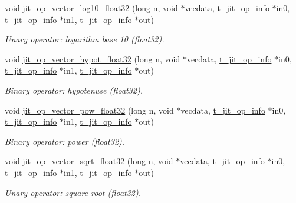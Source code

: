 \begin{DoxyCompactItemize}
void \hyperlink{group__opvecmod_ga8d105c8f794e923c3858dea7dc23eea1}{jit\_\-op\_\-vector\_\-log10\_\-float32} (long n, void $\ast$vecdata, \hyperlink{structt__jit__op__info}{t\_\-jit\_\-op\_\-info} $\ast$in0, \hyperlink{structt__jit__op__info}{t\_\-jit\_\-op\_\-info} $\ast$in1, \hyperlink{structt__jit__op__info}{t\_\-jit\_\-op\_\-info} $\ast$out)
\begin{DoxyCompactList}\small\item\em Unary operator: logarithm base 10 (float32). \item\end{DoxyCompactList}\item 
void \hyperlink{group__opvecmod_ga4cb86d8baf03ef12a90096aef213784d}{jit\_\-op\_\-vector\_\-hypot\_\-float32} (long n, void $\ast$vecdata, \hyperlink{structt__jit__op__info}{t\_\-jit\_\-op\_\-info} $\ast$in0, \hyperlink{structt__jit__op__info}{t\_\-jit\_\-op\_\-info} $\ast$in1, \hyperlink{structt__jit__op__info}{t\_\-jit\_\-op\_\-info} $\ast$out)
\begin{DoxyCompactList}\small\item\em Binary operator: hypotenuse (float32). \item\end{DoxyCompactList}\item 
void \hyperlink{group__opvecmod_ga8e5c012f8dcf346065ce6011a676a8dc}{jit\_\-op\_\-vector\_\-pow\_\-float32} (long n, void $\ast$vecdata, \hyperlink{structt__jit__op__info}{t\_\-jit\_\-op\_\-info} $\ast$in0, \hyperlink{structt__jit__op__info}{t\_\-jit\_\-op\_\-info} $\ast$in1, \hyperlink{structt__jit__op__info}{t\_\-jit\_\-op\_\-info} $\ast$out)
\begin{DoxyCompactList}\small\item\em Binary operator: power (float32). \item\end{DoxyCompactList}\item 
void \hyperlink{group__opvecmod_gaafc329ba4b3589f415349f592b435465}{jit\_\-op\_\-vector\_\-sqrt\_\-float32} (long n, void $\ast$vecdata, \hyperlink{structt__jit__op__info}{t\_\-jit\_\-op\_\-info} $\ast$in0, \hyperlink{structt__jit__op__info}{t\_\-jit\_\-op\_\-info} $\ast$in1, \hyperlink{structt__jit__op__info}{t\_\-jit\_\-op\_\-info} $\ast$out)
\begin{DoxyCompactList}\small\item\em Unary operator: square root (float32). \item\end{DoxyCompactList}\item 

\end{DoxyCompactItemize}
